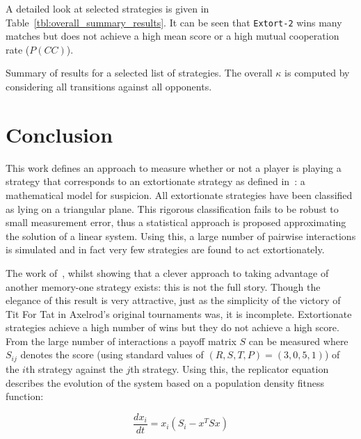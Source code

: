 \documentclass[a4paper]{article}
\begin{document}
A detailed look at selected strategies is given in
Table~\ref{tbl:overall_summary_results}. It can be seen that \texttt{Extort-2}
wins many matches but does not achieve a high mean score or a high mutual
cooperation rate (\(P(CC)\)).

\begin{table}[!hbtp]
    \begin{center}
    \tiny
    
    \end{center}
    \caption{Summary of results for a selected list of strategies. The overall
             \(\kappa\) is computed by considering all transitions against all
             opponents.}
    \label{tbl:overall_summary_results}
\end{table}

\section{Conclusion}\label{sec:conclusion}

This work defines an approach to measure whether or not a player is playing a
strategy that corresponds to an extortionate strategy as defined
in~\cite{Press2012}: a mathematical model for suspicion. All extortionate
strategies have been classified as lying on a triangular plane.  This rigorous
classification fails to be robust to small measurement error, thus a statistical
approach is proposed approximating the solution of a linear system. Using this,
a large number of pairwise interactions is simulated and in fact very few
strategies are found to act extortionately.

The work of~\cite{Press2012}, whilst showing that a clever approach to taking
advantage of another memory-one strategy exists: this is not the full story.
Though the elegance of this result is very attractive, just as the simplicity of
the victory of Tit For Tat in Axelrod's original tournaments was, it is
incomplete.  Extortionate strategies achieve a high number of wins but they do
not achieve a high score.
From the large number of interactions a payoff matrix \(S\)
can be measured where \(S_{ij}\) denotes the score (using standard values of
\((R, S, T, P) = (3, 0, 5, 1)\)) of the \(i\)th strategy against the \(j\)th
strategy. Using this, the replicator equation describes the evolution of the
system based on a population density fitness function:

\begin{equation}\label{eqn:replicator_dynamics}
    \frac{dx_i}{dt} = x_i(S_i-x^TS x)
\end{equation}
\end{document}
